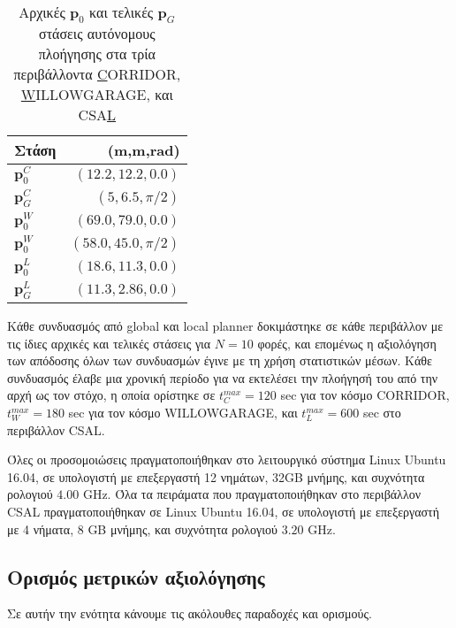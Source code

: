 \begin{table}[h]\centering
  \renewcommand{\arraystretch}{1.3}
  \begin{tabular}{lr}
    Στάση         & (m,m,rad)             \\ \toprule
    $\bm{p}_0^C$  & $(12.2,12.2,0.0)$     \\
    $\bm{p}_G^C$  & $(5,6.5,\pi/2)$       \\ \midrule
    $\bm{p}_0^W$  & $(69.0,79.0,0.0)$     \\
    $\bm{p}_0^W$  & $(58.0,45.0,\pi/2)$   \\ \midrule
    $\bm{p}_0^L$  & $(18.6,11.3,0.0)$     \\
    $\bm{p}_G^L$  & $(11.3,2.86,0.0)$     \\ \bottomrule
    \end{tabular}
  \caption{\small Αρχικές $\bm{p}_0$ και τελικές $\bm{p}_G$ στάσεις αυτόνομους
           πλοήγησης στα τρία περιβάλλοντα \underline{C}ORRIDOR,
           \underline{W}ILLOWGARAGE, και CSA\underline{L}}
  \label{tbl:02_01_03:initial_and_goal_poses}
\end{table}

Κάθε συνδυασμός από global και local planner δοκιμάστηκε σε κάθε περιβάλλον με
τις ίδιες αρχικές και τελικές στάσεις για $N = 10$ φορές, και επομένως η
αξιολόγηση των απόδοσης όλων των συνδυασμών έγινε με τη χρήση στατιστικών
μέσων. Κάθε συνδυασμός έλαβε μια χρονική περίοδο για να εκτελέσει την πλοήγησή
του από την αρχή ως τον στόχο, η οποία ορίστηκε σε $t_C^{max} = 120$ sec για
τον κόσμο CORRIDOR, $t_W^{max} = 180$ sec για τον κόσμο WILLOWGARAGE, και
$t_L^{max} = 600$ sec στο περιβάλλον CSAL.

Όλες οι προσομοιώσεις πραγματοποιήθηκαν στο λειτουργικό σύστημα Linux Ubuntu
16.04, σε υπολογιστή με επεξεργαστή 12 νημάτων, 32GB μνήμης, και συχνότητα
ρολογιού $4.00$ GHz. Όλα τα πειράματα που πραγματοποιήθηκαν στο περιβάλλον CSAL
πραγματοποιήθηκαν σε Linux Ubuntu 16.04, σε υπολογιστή με επεξεργαστή με 4
νήματα, $8$ GB μνήμης, και συχνότητα ρολογιού $3.20$ GHz.



\subsection{Ορισμός μετρικών αξιολόγησης}
\label{subsection:02_01_03:02}

Σε αυτήν την ενότητα κάνουμε τις ακόλουθες παραδοχές και ορισμούς.

